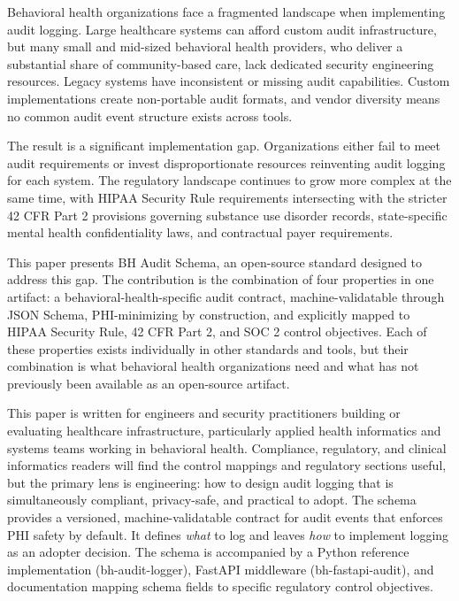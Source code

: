 \documentclass[11pt,a4paper]{article}
\begin{document}
Behavioral health organizations face a fragmented landscape when implementing audit logging. Large healthcare systems can afford custom audit infrastructure, but many small and mid-sized behavioral health providers, who deliver a substantial share of community-based care, lack dedicated security engineering resources. Legacy systems have inconsistent or missing audit capabilities. Custom implementations create non-portable audit formats, and vendor diversity means no common audit event structure exists across tools.

The result is a significant implementation gap. Organizations either fail to meet audit requirements or invest disproportionate resources reinventing audit logging for each system. The regulatory landscape continues to grow more complex at the same time, with HIPAA Security Rule requirements intersecting with the stricter 42 CFR Part 2 provisions governing substance use disorder records, state-specific mental health confidentiality laws, and contractual payer requirements.

This paper presents BH Audit Schema, an open-source standard designed to address this gap. The contribution is the combination of four properties in one artifact: a behavioral-health-specific audit contract, machine-validatable through JSON Schema, PHI-minimizing by construction, and explicitly mapped to HIPAA Security Rule, 42 CFR Part 2, and SOC 2 control objectives. Each of these properties exists individually in other standards and tools, but their combination is what behavioral health organizations need and what has not previously been available as an open-source artifact.

This paper is written for engineers and security practitioners building or evaluating healthcare infrastructure, particularly applied health informatics and systems teams working in behavioral health. Compliance, regulatory, and clinical informatics readers will find the control mappings and regulatory sections useful, but the primary lens is engineering: how to design audit logging that is simultaneously compliant, privacy-safe, and practical to adopt. The schema provides a versioned, machine-validatable contract for audit events that enforces PHI safety by default. It defines \textit{what} to log and leaves \textit{how} to implement logging as an adopter decision. The schema is accompanied by a Python reference implementation (bh-audit-logger), FastAPI middleware (bh-fastapi-audit), and documentation mapping schema fields to specific regulatory control objectives.
\end{document}

